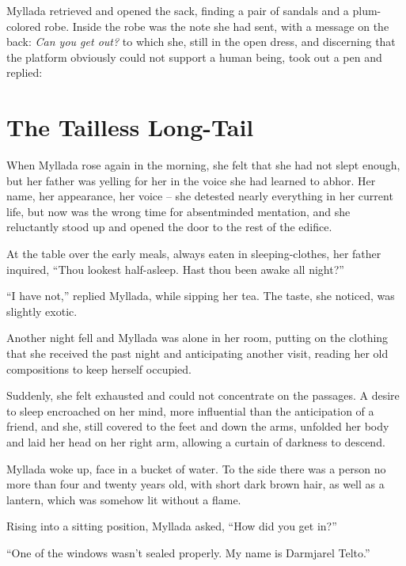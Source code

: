 Myllada retrieved and opened the sack, finding a pair of sandals and a plum-colored robe. Inside the robe was the note she had sent, with a message on the back: \emph{Can you get out?} to which she, still in the open dress, and discerning that the platform obviously could not support a human being, took out a pen and replied:


\chapter{The Tailless Long-Tail}

When Myllada rose again in the morning, she felt that she had not slept enough, but her father was yelling for her in the voice she had learned to abhor. Her name, her appearance, her voice -- she detested nearly everything in her current life, but now was the wrong time for absentminded mentation, and she reluctantly stood up and opened the door to the rest of the edifice.

At the table over the early meals, always eaten in sleeping-clothes, her father inquired, ``Thou lookest half-asleep. Hast thou been awake all night?''

``I have not,'' replied Myllada, while sipping her tea. The taste, she noticed, was slightly exotic.

\centeredstars

Another night fell and Myllada was alone in her room, putting on the clothing that she received the past night and anticipating another visit, reading her old compositions to keep herself occupied.

Suddenly, she felt exhausted and could not concentrate on the passages. A desire to sleep encroached on her mind, more influential than the anticipation of a friend, and she, still covered to the feet and down the arms, unfolded her body and laid her head on her right arm, allowing a curtain of darkness to descend.

\centeredstars

Myllada woke up, face in a bucket of water. To the side there was a person no more than four and twenty years old, with short dark brown hair, as well as a lantern, which was somehow lit without a flame.

Rising into a sitting position, Myllada asked, ``How did you get in?''

``One of the windows wasn't sealed properly. My name is Darmjarel Telto.''

